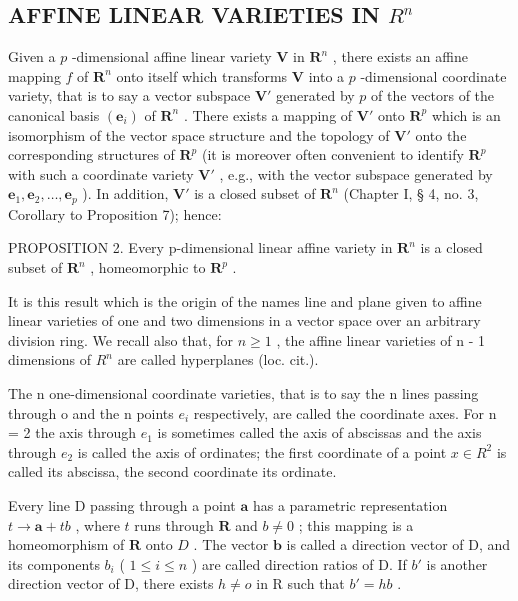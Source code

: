 \subsection{\texorpdfstring{AFFINE LINEAR VARIETIES IN \(R^{n}\)}{AFFINE LINEAR VARIETIES IN R TO THE N}}

Given a \(p\) -dimensional affine linear variety \(\mathbf{V}\) in \(\mathbf{R}^n\) , there exists an affine mapping \(f\) of \(\mathbf{R}^n\) onto itself which transforms \(\mathbf{V}\) into a \(p\) -dimensional coordinate variety, that is to say a vector subspace \(\mathbf{V}'\) generated by \(p\) of the vectors of the canonical basis \((\boldsymbol{e}_i)\) of \(\mathbf{R}^n\) . There exists a mapping of \(\mathbf{V}'\) onto \(\mathbf{R}^p\) which is an isomorphism of the vector space structure and the topology of \(\mathbf{V}'\) onto the corresponding structures of \(\mathbf{R}^p\) (it is moreover often convenient to identify \(\mathbf{R}^p\) with such a coordinate variety \(\mathbf{V}'\) , e.g., with the vector subspace generated by \(\boldsymbol{e}_1, \boldsymbol{e}_2, \ldots, \boldsymbol{e}_p\) ). In addition, \(\mathbf{V}'\) is a closed subset of \(\mathbf{R}^n\) (Chapter I, § 4, no. 3, Corollary to Proposition 7); hence:

PROPOSITION 2. Every p-dimensional linear affine variety in \(\mathbf{R}^n\) is a closed subset of \(\mathbf{R}^n\) , homeomorphic to \(\mathbf{R}^p\) .

It is this result which is the origin of the names line and plane given to affine linear varieties of one and two dimensions in a vector space over an arbitrary division ring. We recall also that, for \(n \geqslant 1\) , the affine linear varieties of n - 1 dimensions of \(R^{n}\) are called hyperplanes (loc. cit.).

The n one-dimensional coordinate varieties, that is to say the n lines passing through o and the n points \(e_{i}\) respectively, are called the coordinate axes. For n = 2 the axis through \(e_{1}\) is sometimes called the axis of abscissas and the axis through \(e_{2}\) is called the axis of ordinates; the first coordinate of a point \(x \in R^{2}\) is called its abscissa, the second coordinate its ordinate.

Every line D passing through a point \(\pmb{a}\) has a parametric representation \(t \to \pmb{a} + tb\) , where \(t\) runs through \(\mathbf{R}\) and \(b \neq 0\) ; this mapping is a homeomorphism of \(\mathbf{R}\) onto \(D\) . The vector \(\pmb{b}\) is called a direction vector of D, and its components \(b_{i}\) ( \(1 \leqslant i \leqslant n\) ) are called direction ratios of D. If \(b'\) is another direction vector of D, there exists \(h \neq o\) in R such that \(b' = hb\) .

